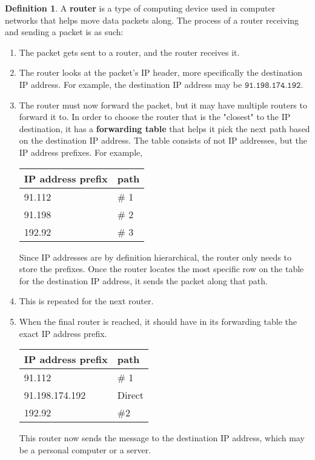\documentclass[a4paper, 12pt]{report}
\theoremstyle{remark}
\theoremstyle{definition}
\newtheorem{definition}{Definition}[section]
\begin{document}
\begin{definition}
A \textbf{router} is a type of computing device used in computer networks that helps move data packets along. The process of a router receiving and sending a packet is as such: 
\begin{enumerate}
    \item The packet gets sent to a router, and the router receives it. 
    \item The router looks at the packet's IP header, more specifically the destination IP address. For example, the destination IP address may be $\texttt{91.198.174.192}$. 
    \item The router must now forward the packet, but it may have multiple routers to forward it to. In order to choose the router that is the "closest" to the IP destination, it has a \textbf{forwarding table} that helps it pick the next path based on the destination IP address. The table consists of not IP addresses, but the IP address prefixes. For example, 
    \begin{center}
    \begin{tabular}{l|l}
        IP address prefix & path\\
        \hline
        91.112 & \# 1\\
        91.198 & \# 2 \\
        192.92 & \# 3
    \end{tabular}
    \end{center}
    Since IP addresses are by definition hierarchical, the router only needs to store the prefixes. Once the router locates the most specific row on the table for the destination IP address, it sends the packet along that path. 
    \item This is repeated for the next router. 
    \item When the final router is reached, it should have in its forwarding table the exact IP address prefix. 
    \begin{center}
    \begin{tabular}{l|l}
        IP address prefix & path \\
        \hline
        91.112 & \# 1 \\
        91.198.174.192 & Direct \\
        192.92 & \#2 
    \end{tabular}
    \end{center}
    This router now sends the message to the destination IP address, which may be a personal computer or a server. 
\end{enumerate}
\end{definition}
\end{document}
